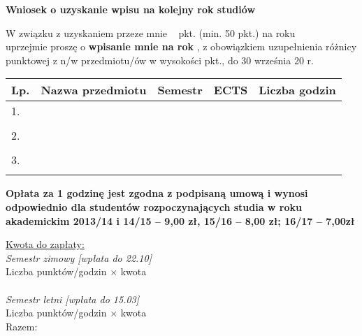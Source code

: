 \documentclass{wmiisubmission}
\begin{document}
\cracowdate
{}
\studentaddress
\addressee[-3em]{\piotrniemiec}
\vskip 1.0cm

\begin{center}
{\Large \textbf{Wniosek o uzyskanie wpisu na kolejny rok studiów}}
\end{center}

\vskip 0.5cm

W związku z uzyskaniem przeze mnie \fillField{2cm}~ pkt. (min. 50 pkt.) na roku
\dotfill\\ uprzejmie proszę o \textbf{wpisanie mnie na rok}
\fillField{3cm}, z obowiązkiem uzupełnienia różnicy punktowej z n/w przedmiotu/ów
 w wysokości \fillField{2cm} pkt., do 30 września 20\fillField{1cm} r.\\

\begin{tabularx}{\textwidth}{|l|X|l|l|l|}
    \hline
    \textbf{Lp.} & \textbf{Nazwa przedmiotu} \hspace{0.9cm} & {\textbf{Semestr}} & \textbf{ECTS} & {\textbf{Liczba godzin}} \\
    \hline
    1.  &   &   &  &\\
        &   &   &  &\\
    \hline
    2.  &   &   &  &\\
        &   &   &  &\\
    \hline
    3.  &   &   &  &\\
        &   &   &  &\\
    \hline
\end{tabularx}

\vskip 0.3cm

\begin{minipage}{\textwidth}
    \footnotesize
    \bf
    Opłata za 1 godzinę jest zgodna z podpisaną umową i wynosi odpowiednio dla studentów rozpoczynających studia w roku akademickim 2013/14 i 14/15 – 9,00 zł, 15/16 – 8,00 zł; 16/17 – 7,00zł
\end{minipage}

\vfill

\underline{Kwota do zapłaty:}\\
\textit{Semestr zimowy [wpłata do 22.10]}\\
Liczba punktów/godzin \dotfill $\times$ kwota \dotfill \\\\
\textit{Semestr letni [wpłata do 15.03]}\\
Liczba punktów/godzin \dotfill $\times$ kwota \dotfill \\

\vskip 0.6cm
\hspace{\fill} Razem: \fillField{6cm} \hspace{2.0cm}

\vskip 1.6cm
\studentsignature
\vfill

\end{document}
